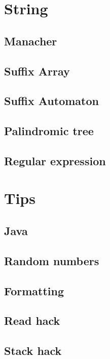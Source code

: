 \documentclass[titlepage, a4paper,10pt]{article}
\begin{document}
\begin{multicols}{2}
\begin{spacing}{0.6}
{		\section{String}
			\subsection{Manacher}
				
			\subsection{Suffix Array}
				
			\subsection{Suffix Automaton}
				
			\subsection{Palindromic tree}
				
			\subsection{Regular expression}
				
		\section{Tips}
			\subsection{Java}
				
			\subsection{Random numbers}
				
			\subsection{Formatting}
				
			\subsection{Read hack}
				
			\subsection{Stack hack}
				
}
\end{spacing}
\end{multicols}
\end{document}

